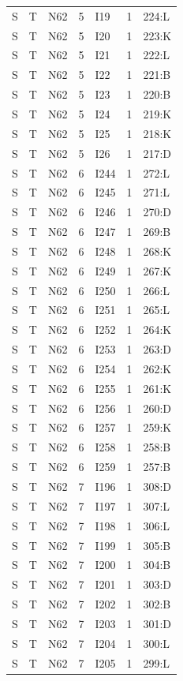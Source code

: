 {\begin{longtable}{lllrlrp{.35\linewidth}}
S & T & N62 & 5 & I19 & 1 & 224:L \\
S & T & N62 & 5 & I20 & 1 & 223:K \\
S & T & N62 & 5 & I21 & 1 & 222:L \\
S & T & N62 & 5 & I22 & 1 & 221:B \\
S & T & N62 & 5 & I23 & 1 & 220:B \\
S & T & N62 & 5 & I24 & 1 & 219:K \\
S & T & N62 & 5 & I25 & 1 & 218:K \\
S & T & N62 & 5 & I26 & 1 & 217:D \\
S & T & N62 & 6 & I244 & 1 & 272:L \\
S & T & N62 & 6 & I245 & 1 & 271:L \\
S & T & N62 & 6 & I246 & 1 & 270:D \\
S & T & N62 & 6 & I247 & 1 & 269:B \\
S & T & N62 & 6 & I248 & 1 & 268:K \\
S & T & N62 & 6 & I249 & 1 & 267:K \\
S & T & N62 & 6 & I250 & 1 & 266:L \\
S & T & N62 & 6 & I251 & 1 & 265:L \\
S & T & N62 & 6 & I252 & 1 & 264:K \\
S & T & N62 & 6 & I253 & 1 & 263:D \\
S & T & N62 & 6 & I254 & 1 & 262:K \\
S & T & N62 & 6 & I255 & 1 & 261:K \\
S & T & N62 & 6 & I256 & 1 & 260:D \\
S & T & N62 & 6 & I257 & 1 & 259:K \\
S & T & N62 & 6 & I258 & 1 & 258:B \\
S & T & N62 & 6 & I259 & 1 & 257:B \\
S & T & N62 & 7 & I196 & 1 & 308:D \\
S & T & N62 & 7 & I197 & 1 & 307:L \\
S & T & N62 & 7 & I198 & 1 & 306:L \\
S & T & N62 & 7 & I199 & 1 & 305:B \\
S & T & N62 & 7 & I200 & 1 & 304:B \\
S & T & N62 & 7 & I201 & 1 & 303:D \\
S & T & N62 & 7 & I202 & 1 & 302:B \\
S & T & N62 & 7 & I203 & 1 & 301:D \\
S & T & N62 & 7 & I204 & 1 & 300:L \\
S & T & N62 & 7 & I205 & 1 & 299:L \\

\end{longtable}}
